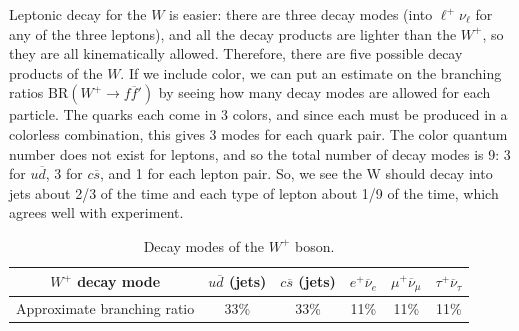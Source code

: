 \documentclass[11pt, oneside]{article}   	%
\theoremstyle{definition}
\numberwithin{equation}{subsection}		%
\begin{document}
Leptonic decay for the $W$ is easier: there are three decay modes (into $\ell^+\nu_\ell$ for any of the three leptons), and all the decay 
products are lighter than the $W^+$, so they are all kinematically allowed. Therefore, there are five possible decay products of the $W$. 
If we include color, we can put an estimate on the branching ratios $\mathrm{BR}(W^+\rightarrow f\overline f')$ by seeing how many decay 
modes are allowed for each particle. The quarks each come in 3 colors, and since each must be produced in a colorless combination, 
this gives 3 modes for each quark pair. The color quantum number does not exist for leptons, and so the total number of decay modes is 
9: 3 for $u\overline d$, 3 for $c\overline s$, and 1 for each lepton pair. So, we see the W should decay into jets about 2/3 of the time 
and each type of lepton about 1/9 of the time, which agrees well with experiment.
\begin{table}[H]
	\centering
	\begin{tabular}{ | c | c | c | c | c | c | }
		\hline
		$W^+$ decay mode & $u\overline d$ (jets) & $c\overline s$ (jets) & $e^+\overline\nu_e$ & $\mu^+\overline\nu_\mu$ & 
		$\tau^+\overline\nu_\tau$ \\
		\hline
		Approximate branching ratio & 33\% & 33\% & 11\% & 11\% & 11\% \\
		\hline
	\end{tabular}
	\caption{Decay modes of the $W^+$ boson.}
	\label{table:w_decay}
\end{table}
\end{document}
